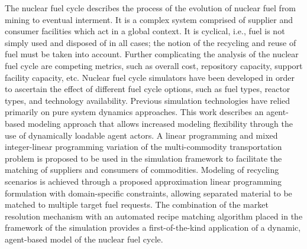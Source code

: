 The nuclear fuel cycle describes the process of the evolution of nuclear fuel
from mining to eventual interment. It is a complex system comprised of supplier
and consumer facilities which act in a global context. It is cyclical, i.e.,
fuel is not simply used and disposed of in all cases; the notion of the
recycling and reuse of fuel must be taken into account. Further complicating the
analysis of the nuclear fuel cycle are competing metrics, such as overall cost,
repository capacity, support facility capacity, etc. Nuclear fuel cycle
simulators have been developed in order to ascertain the effect of different
fuel cycle options, such as fuel types, reactor types, and technology
availability. Previous simulation technologies have relied primarily on pure
system dynamics approaches. This work describes an agent-based modeling approach
that allows increased modeling flexibility through the use of dynamically
loadable agent actors. A linear programming and mixed integer-linear programming
variation of the multi-commodity transportation problem is proposed to be used
in the simulation framework to facilitate the matching of suppliers and
consumers of commodities. Modeling of recycling scenarios is achieved through a
proposed approximation linear programming formulation with domain-specific
constraints, allowing separated material to be matched to multiple target fuel
requests. The combination of the market resolution mechanism with an automated
recipe matching algorithm placed in the framework of the \Cyclus simulation
provides a first-of-the-kind application of a dynamic, agent-based model of the
nuclear fuel cycle.